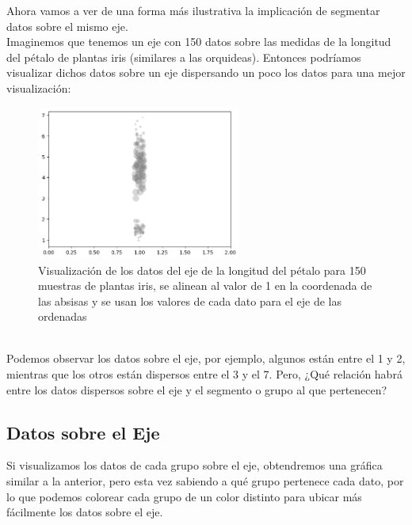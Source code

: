 \documentclass{article}
\begin{document}
Ahora vamos a ver de una forma más ilustrativa la implicación de segmentar datos sobre el mismo eje.
\\[12pt]
Imaginemos que tenemos un eje con 150 datos sobre las medidas de la longitud del pétalo de plantas iris (similares a las orquideas). Entonces podríamos visualizar dichos datos sobre un eje dispersando un poco los datos para una mejor visualización:
\begin{figure}[h]
    \centering
    \includegraphics[width=0.6\textwidth]{figures/data1.png}
    \captionsetup{width=0.8\textwidth}
    \caption{Visualización de los datos del eje de la longitud del pétalo para 150 muestras de plantas iris, se alinean al valor de 1 en la coordenada de las absisas y se usan los valores de cada dato para el eje de las ordenadas}
    \label{fig:data1}
\end{figure}
\\
Podemos observar los datos sobre el eje, por ejemplo, algunos están entre el 1 y 2, mientras que los otros están dispersos entre el 3 y el 7. Pero, ¿Qué relación habrá entre los datos dispersos sobre el eje y el segmento o grupo al que pertenecen?

\subsection{Datos sobre el Eje}

Si visualizamos los datos de cada grupo sobre el eje, obtendremos una gráfica similar a la anterior, pero esta vez sabiendo a qué grupo pertenece cada dato, por lo que podemos colorear cada grupo de un color distinto para ubicar más fácilmente los datos sobre el eje.

\clearpage
\end{document}
